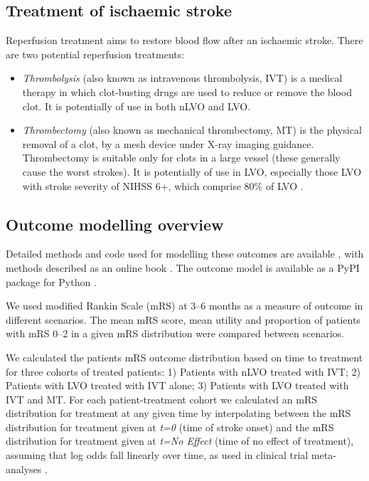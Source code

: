 \subsection{Treatment of ischaemic stroke}

Reperfusion treatment aims to restore blood flow after an ischaemic stroke. There are two potential reperfusion treatments:

\begin{itemize}
    \item \textit{Thrombolysis} (also known as intravenous thrombolysis, IVT) is a medical therapy in which clot-busting drugs are used to reduce or remove the blood clot. It is potentially of use in both nLVO and LVO.
    
    \item \textit{Thrombectomy} (also known as mechanical thrombectomy, MT) is the physical removal of a clot, by a mesh device under X-ray imaging guidance. Thrombectomy is suitable only for clots in a large vessel (these generally cause the worst strokes). It is potentially of use in LVO, especially those LVO with stroke severity of NIHSS 6+, which comprise 80\% of LVO \cite{mcmeekin_estimating_2017}.
\end{itemize}


\subsection{Outcome modelling overview}

Detailed methods and code used for modelling these outcomes are available \cite{github2}, with methods described as an online book \cite{github3}. The outcome model is available as a PyPI package for Python \cite{pypi}.

We used modified Rankin Scale (mRS) at 3--6 months as a measure of outcome in different scenarios. The mean mRS score, mean utility and proportion of patients with mRS 0--2 in a given mRS distribution were compared between scenarios.

We calculated the patients mRS outcome distribution based on time to treatment for three cohorts of treated patients: 1) Patients with nLVO treated with IVT; 2) Patients with LVO treated with IVT alone; 3) Patients with LVO treated with IVT and MT. For each patient-treatment cohort we calculated an mRS distribution for treatment at any given time by interpolating between the mRS distribution for treatment given at \emph{t=0} (time of stroke onset) and the mRS distribution for treatment given at \emph{t=No Effect} (time of no effect of treatment), assuming that log odds fall linearly over time, as used in clinical trial meta-analyses \cite{emberson_effect_2014, fransen_time_2016}.

